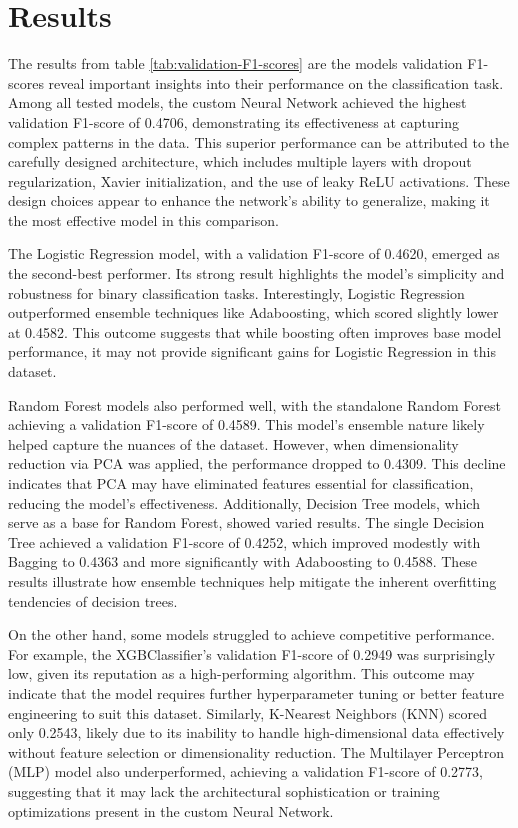 \documentclass{article} %
\begin{document}
\section{Results}
The results from table \ref{tab:validation-F1-scores} are the models validation F1-scores reveal important insights into their performance on the classification task. Among all tested models, the custom Neural Network achieved the highest validation F1-score of 0.4706, demonstrating its effectiveness at capturing complex patterns in the data. This superior performance can be attributed to the carefully designed architecture, which includes multiple layers with dropout regularization, Xavier initialization, and the use of leaky ReLU activations. These design choices appear to enhance the network's ability to generalize, making it the most effective model in this comparison.

The Logistic Regression model, with a validation F1-score of 0.4620, emerged as the second-best performer. Its strong result highlights the model's simplicity and robustness for binary classification tasks. Interestingly, Logistic Regression outperformed ensemble techniques like Adaboosting, which scored slightly lower at 0.4582. This outcome suggests that while boosting often improves base model performance, it may not provide significant gains for Logistic Regression in this dataset.

Random Forest models also performed well, with the standalone Random Forest achieving a validation F1-score of 0.4589. This model's ensemble nature likely helped capture the nuances of the dataset. However, when dimensionality reduction via PCA was applied, the performance dropped to 0.4309. This decline indicates that PCA may have eliminated features essential for classification, reducing the model's effectiveness. Additionally, Decision Tree models, which serve as a base for Random Forest, showed varied results. The single Decision Tree achieved a validation F1-score of 0.4252, which improved modestly with Bagging to 0.4363 and more significantly with Adaboosting to 0.4588. These results illustrate how ensemble techniques help mitigate the inherent overfitting tendencies of decision trees.

On the other hand, some models struggled to achieve competitive performance. For example, the XGBClassifier's validation F1-score of 0.2949 was surprisingly low, given its reputation as a high-performing algorithm. This outcome may indicate that the model requires further hyperparameter tuning or better feature engineering to suit this dataset. Similarly, K-Nearest Neighbors (KNN) scored only 0.2543, likely due to its inability to handle high-dimensional data effectively without feature selection or dimensionality reduction. The Multilayer Perceptron (MLP) model also underperformed, achieving a validation F1-score of 0.2773, suggesting that it may lack the architectural sophistication or training optimizations present in the custom Neural Network.
\end{document}
